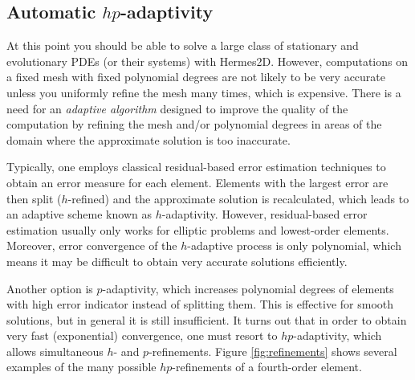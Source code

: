 
\subsection{Automatic $hp$-adaptivity}

At this point you should be able to solve a large class of stationary and evolutionary PDEs
(or their systems) with Hermes2D. However, computations on a fixed mesh with fixed 
polynomial degrees are not likely to be very accurate unless you uniformly refine the mesh
many times, which is expensive. There is a need for an {\it adaptive algorithm} designed
to improve the quality of the computation by refining the mesh and/or polynomial degrees
in areas of the domain where the approximate solution is too inaccurate.

Typically, one employs classical residual-based error estimation techniques to obtain an
error measure for each element. Elements with the largest error are then split ($h$-refined)
and the approximate solution is recalculated, which leads to an adaptive scheme known as
$h$-adaptivity. However, residual-based error estimation usually only works for elliptic
problems and lowest-order elements. Moreover, error convergence of the $h$-adaptive process
is only polynomial, which means it may be difficult to obtain very accurate solutions efficiently.

Another option is $p$-adaptivity, which increases polynomial degrees of elements with high
error indicator instead of splitting them. This is effective for smooth solutions, but in 
general it is still insufficient. It turns out that in order to obtain very fast (exponential)
convergence, one must resort to $hp$-adaptivity, which allows simultaneous $h$- and $p$-refinements.
Figure \ref{fig:refinements} shows several examples of the many possible $hp$-refinements of
a fourth-order element.

